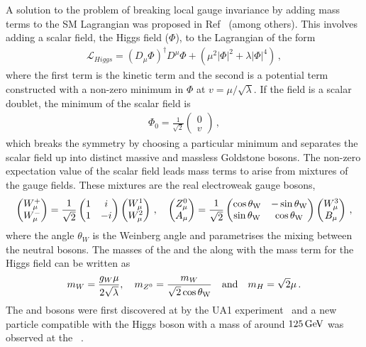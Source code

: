 A solution to the problem of breaking local gauge invariance by adding mass terms to the SM Lagrangian 
was proposed in Ref~\cite{Higgs:1966ev} (among others).
This involves adding a scalar field, the Higgs field ($\Phi$), to the Lagrangian of the form 
\begin{align}
\mathcal{L}_{Higgs} = (D_\mu \Phi )^{\dagger} D^\mu \Phi  + \left( \mu^2 |\Phi|^2  + \lambda |\Phi|^4 \right) \, ,
\end{align}
where the first term is the kinetic term and the second is a potential term constructed with a 
non-zero minimum in $\Phi$ at  $v = \mu/\sqrt{\lambda}$.
If the field is a scalar doublet, the minimum of the scalar field is
\begin{align}
\Phi_0 = \frac{1}{\sqrt{2}} \begin{pmatrix}0\\v\end{pmatrix} \, ,
\end{align}
which breaks the symmetry by choosing a particular minimum and separates the 
scalar field up into distinct massive and massless Goldstone bosons.	
The non-zero expectation value of the scalar field leads mass terms to arise from mixtures of the gauge fields.
These mixtures are the real electroweak gauge bosons, 
\begin{align}
\begin{pmatrix}W^{+}_{\mu}\\W^{-}_{\mu}\end{pmatrix} = \frac{1}{\sqrt{2}}\begin{pmatrix}1&i\\1&-i\end{pmatrix}\begin{pmatrix}W^{1}_{\mu}\\W^{2}_{\mu}\end{pmatrix}  \, , \quad 
\begin{pmatrix}Z^{0}_{\mu}\\A_{\mu}\end{pmatrix} = \frac{1}{\sqrt{2}}\begin{pmatrix}\cos\theta_{\mathrm{W}}&-\sin\theta_{\mathrm{W}}\\\sin\theta_{\mathrm{W}}&\cos\theta_{\mathrm{W}}\end{pmatrix}\begin{pmatrix}W^{3}_{\mu}\\B_{\mu}\end{pmatrix}   \, ,
\end{align}
where the angle $\theta_W$ is the Weinberg angle and parametrises the mixing between the neutral bosons.
The masses of the \Wpm and the \Z  along with the mass term for the Higgs field can be written as 
\begin{align}
m_{W} = \frac{g_W \mu }{2\sqrt{\lambda}} , \quad m_{Z^0} = \frac{m_W}{\sqrt{2}\cos\theta_{\mathrm{W}}} \quad \text{and} \quad m_H = \sqrt{2}\mu \, .
\end{align}
The \Wpm and \Z bosons were first discovered at \cern by the UA1 experiment~\cite{Arnison:1983rp,Arnison:1983mk} and a new particle compatible with the Higgs boson 
with a mass of around $125\mathrm{\,Ge\kern -0.1em V}$ was observed at the \lhc~\cite{CMS:2012gu,ATLAS:2012gk}.

